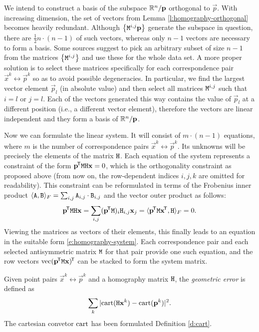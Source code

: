We intend to construct a basis of the subspace $\mathbb{R}^n / \mathbf{p}$ orthogonal to $\vec p$.
With increasing dimension, the set of vectors from Lemma \ref{l:homography-orthogonal} becomes heavily redundant.
Although $\left\{ \mathtt{M}^{i, j} \mathbf{p} \right\}$ generate the subspace in question, there are $\frac {1} {2} n \cdot (n - 1)$ of such vectors, whereas only $n-1$ vectors are necessary to form a basis.
Some sources suggest to pick an arbitrary subset of size $n - 1$ from the matrices $\left\{ \mathtt{M}^{i, j} \right\}$ and use these for the whole data set.\cite{hartley03}
A more proper solution is to select these matrices specifically for each correspondence pair $\vec x^k \leftrightarrow \vec p^k$ so as to avoid possible degeneracies.
In particular, we find the largest vector element $\vec p_l$ (in absolute value) and then select all matrices $\mathtt{M}^{i, j}$ such that $i = l$ or $j = l$.
Each of the vectors generated this way contains the value of $\vec p_l$ at a different position (i.e., a different vector element), therefore the vectors are linear independent and they form a basis of $\mathbb{R}^n / \mathbf{p}$.

Now we can formulate the linear system.
It will consist of $m \cdot (n - 1)$ equations, where $m$ is the number of correspondence pairs $\vec x^k \leftrightarrow \vec p^k$.
Its unknowns will be precisely the elements of the matrix $\mathtt{H}$.
Each equation of the system represents a constraint of the form $\mathbf{p}^{\!\mathsf{T}} \mathtt{M} \mathtt{H} \mathbf{x} = 0$, which is the orthogonality constraint as proposed above (from now on, the row-dependent indices $i, j, k$ are omitted for readability).
This constraint can be reformulated in terms of the Frobenius inner product $\langle \mathtt{A}, \mathtt{B} \rangle_F = \sum_{i, j} \mathtt{A}_{i, j} \cdot \mathtt{B}_{i, j}$ and the vector outer product as follows:
$$\mathbf{p}^{\!\mathsf{T}} \mathtt{M} \mathtt{H} \mathbf{x} = \sum_{i, j} (\mathbf{p}^{\!\mathsf{T}} \mathtt{M})_i \mathtt{H}_{i, j} \mathbf{x}_j = \langle \mathbf{p}^{\!\mathsf{T}} \mathtt{M} \mathbf{x}^{\!\mathsf{T}}, \mathtt{H} \rangle_F = 0.$$
Viewing the matrices as vectors of their elements, this finally leads to an equation in the suitable form \eqref{e:homography-system}.
Each correspondence pair and each selected antisymmetric matrix $\mathtt{M}$ for that pair provide one such equation, and the row vectors $\mathrm{vec} ({\mathbf{p}}^{\!\mathsf{T}} \mathtt{M} \mathbf{x})^{\!\mathsf{T}}$ can be stacked to form the system matrix.

\begin{definition}
Given point pairs $\vec x^k \leftrightarrow \vec p^k$ and a homography matrix $\mathtt{H}$, the \textit{geometric error} is defined as
$$\sum_k |\mathrm{cart}(\mathtt{H} \mathbf{x}^k) - \mathrm{cart}(\mathbf{p}^k)|^2.$$
The cartesian convetor $\mathrm{cart}$ has been formulated Definition \ref{d:cart}.
\end{definition}

